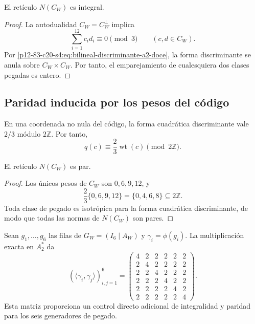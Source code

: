 \begin{lemma}
\label{p12-83-c20-s4:lem:integralidad-pegado-cw}
El retículo \(N(C_W)\) es integral.
\end{lemma}

\begin{proof}
La autodualidad \(C_W=C_W^\perp\) implica
\[
 \sum_{i=1}^{12}c_id_i\equiv0\pmod3
 \qquad(c,d\in C_W).
\]
Por \eqref{p12-83-c20-s4:eq:bilineal-discriminante-a2-doce}, la forma discriminante se
anula sobre \(C_W\times C_W\). Por tanto, el emparejamiento de cualesquiera
dos clases pegadas es entero.
\end{proof}

\subsection{Paridad inducida por los pesos del código}

En una coordenada no nula del código, la forma cuadrática discriminante
vale \(2/3\) módulo \(2\mathbb Z\). Por tanto,
\begin{equation}
 q(c)\equiv\frac23\operatorname{wt}(c)\pmod{2\mathbb Z}.
 \label{p12-83-c20-s4:eq:cuadratica-discriminante-cw}
\end{equation}

\begin{lemma}
\label{p12-83-c20-s4:lem:paridad-pegado-cw}
El retículo \(N(C_W)\) es par.
\end{lemma}

\begin{proof}
Los únicos pesos de \(C_W\) son \(0,6,9,12\), y
\[
 \frac23\{0,6,9,12\}=\{0,4,6,8\}\subseteq2\mathbb Z.
\]
Toda clase de pegado es isotrópica para la forma cuadrática discriminante,
de modo que todas las normas de \(N(C_W)\) son pares.
\end{proof}

Sean \(g_1,\ldots,g_6\) las filas de \(G_W=(I_6\mid A_W)\) y
\(\gamma_i=\phi(g_i)\). La multiplicación exacta en \(A_2^*\) da
\begin{equation}
 (\langle\gamma_i,\gamma_j\rangle)_{i,j=1}^{6}
 =
 \begin{pmatrix}
 4&2&2&2&2&2\\
 2&4&2&2&2&2\\
 2&2&4&2&2&2\\
 2&2&2&4&2&2\\
 2&2&2&2&4&2\\
 2&2&2&2&2&4
 \end{pmatrix}.
 \label{p12-83-c20-s4:eq:gram-generadores-pegado-cw}
\end{equation}
Esta matriz proporciona un control directo adicional de integralidad y
paridad para los seis generadores de pegado.

